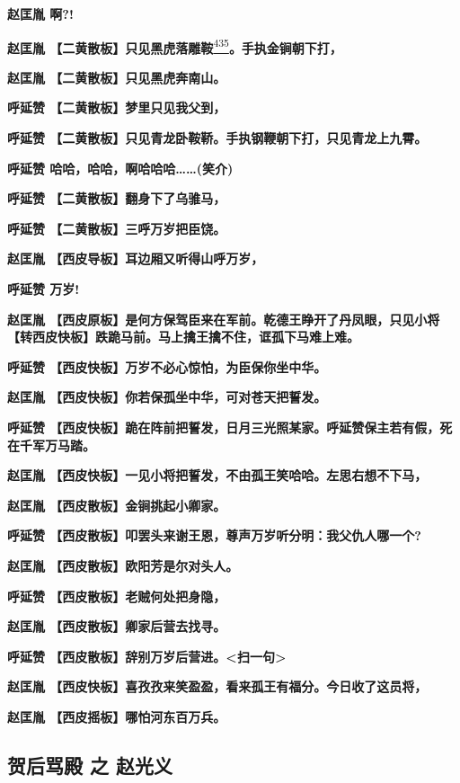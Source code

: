 \textbf{赵匡胤 啊?!}

\textbf{赵匡胤
【二黄散板】只见黑虎落雕鞍}\protect\hyperlink{fn435}{\textsuperscript{435}}\textbf{。手执金锏朝下打，}

\textbf{赵匡胤 【二黄散板】只见黑虎奔南山。}

\textbf{呼延赞 【二黄散板】梦里只见我父到，}

\textbf{呼延赞
【二黄散板】只见青龙卧鞍鞒。手执钢鞭朝下打，只见青龙上九霄。}

\textbf{呼延赞 哈哈，哈哈，啊哈哈哈\ldots{}\ldots{}(笑介)}

\textbf{呼延赞 【二黄散板】翻身下了乌骓马，}

\textbf{呼延赞 【二黄散板】三呼万岁把臣饶。}

\textbf{赵匡胤 【西皮导板】耳边厢又听得山呼万岁，}

\textbf{呼延赞 万岁!}

\textbf{赵匡胤
【西皮原板】是何方保驾臣来在军前。乾德王睁开了丹凤眼，只见小将【转西皮快板】跌跪马前。马上擒王擒不住，诓孤下马难上难。}

\textbf{呼延赞 【西皮快板】万岁不必心惊怕，为臣保你坐中华。}

\textbf{赵匡胤 【西皮快板】你若保孤坐中华，可对苍天把誓发。}

\textbf{呼延赞
【西皮快板】跪在阵前把誓发，日月三光照某家。呼延赞保主若有假，死在千军万马踏。}

\textbf{赵匡胤
【西皮快板】一见小将把誓发，不由孤王笑哈哈。左思右想不下马，}

\textbf{赵匡胤 【西皮散板】金锏挑起小卿家。}

\textbf{呼延赞
【西皮散板】叩罢头来谢王恩，尊声万岁听分明：我父仇人哪一个?}

\textbf{赵匡胤 【西皮散板】欧阳芳是尔对头人。}

\textbf{呼延赞 【西皮散板】老贼何处把身隐，}

\textbf{赵匡胤 【西皮散板】卿家后营去找寻。}

\textbf{呼延赞
【西皮散板】辞别万岁后营进。\textless{}扫一句\textgreater{}}

\textbf{赵匡胤
【西皮快板】喜孜孜来笑盈盈，看来孤王有福分。今日收了这员将，}

\textbf{赵匡胤 【西皮摇板】哪怕河东百万兵。}

\newpage
\hypertarget{ux8d3aux540eux9a82ux6bbf-ux4e4b-ux8d75ux5149ux4e49}{%
\subsection{贺后骂殿 之
赵光义}\label{ux8d3aux540eux9a82ux6bbf-ux4e4b-ux8d75ux5149ux4e49}}

